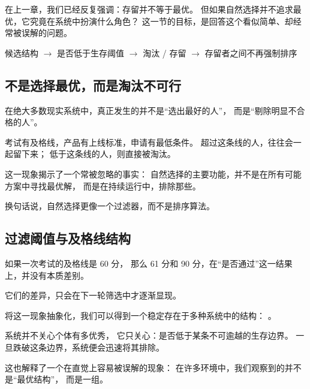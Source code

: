 \documentclass[../main.tex]{subfiles}
\begin{document}
\begin{motivation}
	在上一章，我们已经反复强调：存留并不等于最优。
	但如果自然选择并不追求最优，它究竟在系统中扮演什么角色？
	这一节的目标，是回答这个看似简单、却经常被误解的问题。
\end{motivation}

\begin{logicmap}
	候选结构
	$\rightarrow$ 是否低于生存阈值
	$\rightarrow$ 淘汰 / 存留
	$\rightarrow$ 存留者之间不再强制排序
\end{logicmap}

\subsection{不是选择最优，而是淘汰不可行}

\begin{readingnote}
	在绝大多数现实系统中，真正发生的并不是“选出最好的人”，
	而是“剔除明显不合格的人”。
	
	考试有及格线，产品有上线标准，申请有最低条件。
	超过这条线的人，往往会一起留下来；
	低于这条线的人，则直接被淘汰。
\end{readingnote}

这一现象揭示了一个常被忽略的事实：
自然选择的主要功能，并不是在所有可能方案中寻找最优解，
而是在持续运行中，排除那些。

换句话说，自然选择更像一个过滤器，而不是排序算法。


\subsection{过滤阈值与及格线结构}

\begin{readingnote}
	如果一次考试的及格线是 60 分，
	那么 61 分和 90 分，在“是否通过”这一结果上，并没有本质差别。
	
	它们的差异，只会在下一轮筛选中才逐渐显现。
\end{readingnote}

将这一现象抽象化，我们可以得到一个稳定存在于多种系统中的结构：
。

系统并不关心个体有多优秀，
它只关心：是否低于某条不可逾越的生存边界。
一旦跌破这条边界，系统便会迅速将其排除。


这也解释了一个在直觉上容易被误解的现象：
在许多环境中，我们观察到的并不是“最优结构”，
而是一组。
\end{document}
